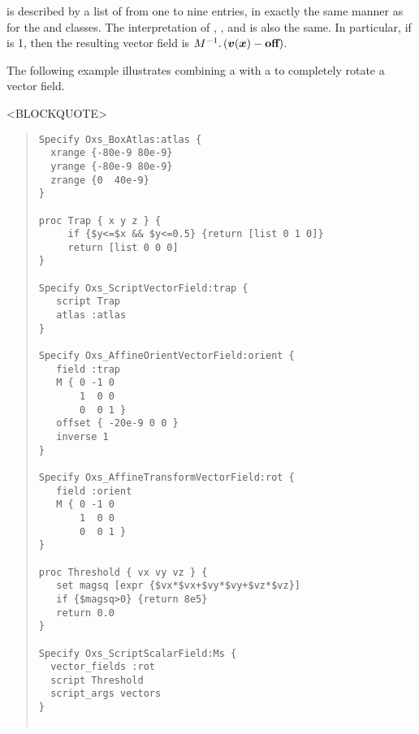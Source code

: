 \begin{description}
 is described by a list of from one to nine entries, in exactly
the same manner as for the
and
classes.  The
interpretation of , , and
 is also the same.  In particular, if
 is 1, then the resulting vector field is
$M^{-1}.\left(\mbox{\boldmath$v$}(\mbox{\boldmath$x$})-\textbf{off}\right)$.

The following example illustrates combining a
 with a
to completely rotate a vector field.
\begin{rawhtml}
<BLOCKQUOTE>
\end{rawhtml}
\begin{quote}
\begin{verbatim}
Specify Oxs_BoxAtlas:atlas {
  xrange {-80e-9 80e-9}
  yrange {-80e-9 80e-9}
  zrange {0  40e-9}
}

proc Trap { x y z } {
     if {$y<=$x && $y<=0.5} {return [list 0 1 0]}
     return [list 0 0 0]
}

Specify Oxs_ScriptVectorField:trap {
   script Trap
   atlas :atlas
}

Specify Oxs_AffineOrientVectorField:orient {
   field :trap
   M { 0 -1 0
       1  0 0
       0  0 1 }
   offset { -20e-9 0 0 }
   inverse 1
}

Specify Oxs_AffineTransformVectorField:rot {
   field :orient
   M { 0 -1 0
       1  0 0
       0  0 1 }
}

proc Threshold { vx vy vz } {
   set magsq [expr {$vx*$vx+$vy*$vy+$vz*$vz}]
   if {$magsq>0} {return 8e5}
   return 0.0
}

Specify Oxs_ScriptScalarField:Ms {
  vector_fields :rot
  script Threshold
  script_args vectors
}


\end{verbatim}
\end{quote}
\end{description}
